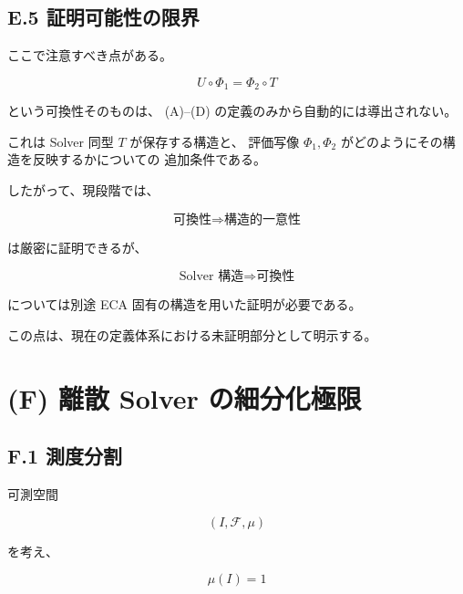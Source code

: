 \documentclass[a4paper,11pt]{article}
\begin{document}

\subsection{E.5 証明可能性の限界}

ここで注意すべき点がある。

\begin{equation}
    U\circ\Phi_1
    =
    \Phi_2\circ T
\end{equation}

という可換性そのものは、
(A)--(D) の定義のみから自動的には導出されない。

これは Solver 同型 $T$ が保存する構造と、
評価写像 $\Phi_1,\Phi_2$ がどのようにその構造を反映するかについての
追加条件である。

したがって、現段階では、

\begin{equation}
    \boxed{
    \text{可換性}
    \Longrightarrow
    \text{構造的一意性}
    }
\end{equation}

は厳密に証明できるが、

\begin{equation}
    \boxed{
    \text{Solver 構造}
    \Longrightarrow
    \text{可換性}
    }
\end{equation}

については別途 ECA 固有の構造を用いた証明が必要である。

この点は、現在の定義体系における未証明部分として明示する。


\section{(F) 離散 Solver の細分化極限}

\subsection{F.1 測度分割}

可測空間

\begin{equation}
    (I,\mathcal{F},\mu)
\end{equation}

を考え、

\begin{equation}
    \mu(I)=1
\end{equation}
\end{document}
